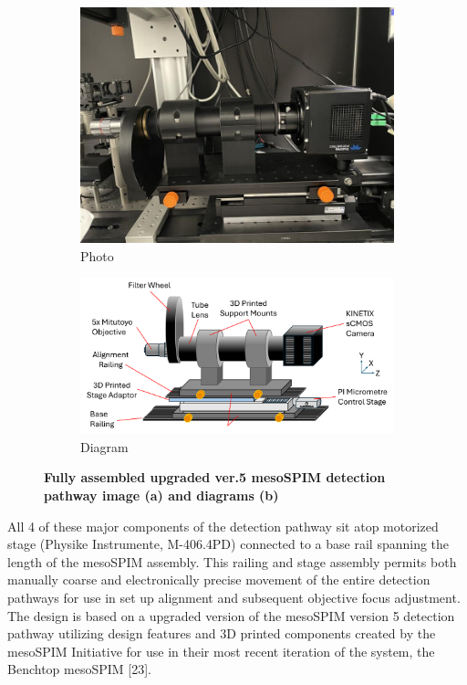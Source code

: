 \begin{figure}[H]
    \centering
    \begin{subfigure}[a]{1\textwidth}
    \centering
    \includegraphics[width=0.75\linewidth]{Images/DetectionPathPhoto.jpg}
    \caption{Photo}
    \end{subfigure}
    \medskip
   
    \begin{subfigure}[b]{1\textwidth}
    \centering
    \includegraphics[width=1\linewidth]{Figures/Detection Diagram.png}
    \caption{Diagram}
    \end{subfigure}
    \caption{\textbf{Fully assembled upgraded ver.5 mesoSPIM detection pathway image (a) and diagrams (b)}}
    
\end{figure}


All 4 of these major components of the detection pathway sit atop motorized stage (Physike Instrumente, M-406.4PD) connected to a base rail spanning the length of the mesoSPIM assembly. This railing and stage assembly permits both manually coarse and electronically precise movement of the entire detection pathways for use in set up alignment and subsequent objective focus adjustment. The design is based on a upgraded version of the mesoSPIM version 5 detection pathway utilizing design features and 3D printed components created by the mesoSPIM Initiative for use in their most recent iteration of the system, the Benchtop mesoSPIM [23].

